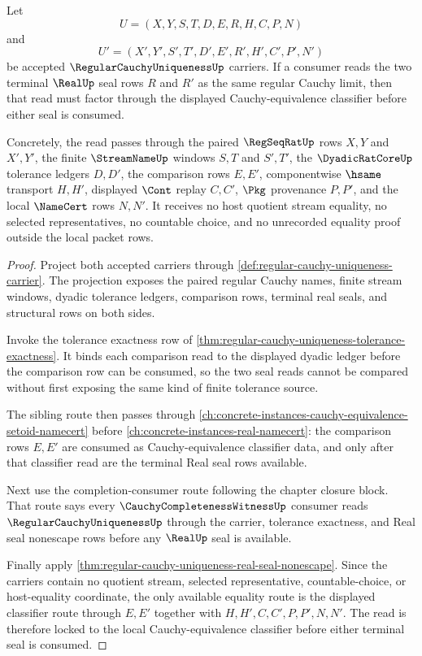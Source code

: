 \begin{theorem}
\label{thm:regular-cauchy-uniqueness-classifier-lock}
Let
$$
U=(X,Y,S,T,D,E,R,H,C,P,N)
$$
and
$$
U'=(X',Y',S',T',D',E',R',H',C',P',N')
$$
be accepted $\RegularCauchyUniquenessUp$ carriers. If a consumer reads the two terminal $\RealUp$ seal rows $R$ and $R'$ as the same regular Cauchy limit, then that read must factor through the displayed Cauchy-equivalence classifier before either seal is consumed.

Concretely, the read passes through the paired $\RegSeqRatUp$ rows $X,Y$ and $X',Y'$, the finite $\StreamNameUp$ windows $S,T$ and $S',T'$, the $\DyadicRatCoreUp$ tolerance ledgers $D,D'$, the comparison rows $E,E'$, componentwise $\hsame$ transport $H,H'$, displayed $\Cont$ replay $C,C'$, $\Pkg$ provenance $P,P'$, and the local $\NameCert$ rows $N,N'$. It receives no host quotient stream equality, no selected representatives, no countable choice, and no unrecorded equality proof outside the local packet rows.
\end{theorem}
\begin{proof}
Project both accepted carriers through \autoref{def:regular-cauchy-uniqueness-carrier}. The projection exposes the paired regular Cauchy names, finite stream windows, dyadic tolerance ledgers, comparison rows, terminal real seals, and structural rows on both sides.

Invoke the tolerance exactness row of \autoref{thm:regular-cauchy-uniqueness-tolerance-exactness}. It binds each comparison read to the displayed dyadic ledger before the comparison row can be consumed, so the two seal reads cannot be compared without first exposing the same kind of finite tolerance source.

The sibling route then passes through \autoref{ch:concrete-instances-cauchy-equivalence-setoid-namecert} before \autoref{ch:concrete-instances-real-namecert}: the comparison rows $E,E'$ are consumed as Cauchy-equivalence classifier data, and only after that classifier read are the terminal Real seal rows available.

Next use the completion-consumer route following the chapter closure block. That route says every $\CauchyCompletenessWitnessUp$ consumer reads $\RegularCauchyUniquenessUp$ through the carrier, tolerance exactness, and Real seal nonescape rows before any $\RealUp$ seal is available.

Finally apply \autoref{thm:regular-cauchy-uniqueness-real-seal-nonescape}. Since the carriers contain no quotient stream, selected representative, countable-choice, or host-equality coordinate, the only available equality route is the displayed classifier route through $E,E'$ together with $H,H',C,C',P,P',N,N'$. The read is therefore locked to the local Cauchy-equivalence classifier before either terminal seal is consumed.
\end{proof}
